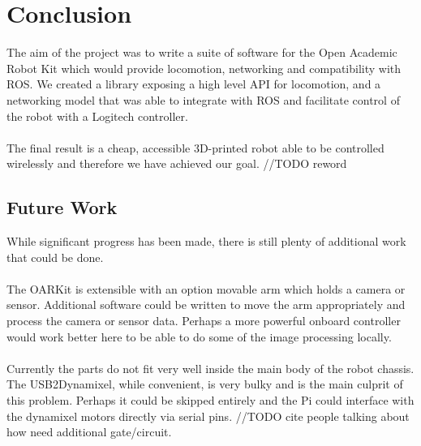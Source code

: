 \documentclass[]{article}
\begin{document}
\section{Conclusion}
The aim of the project was to write a suite of software for the Open Academic Robot Kit which would provide locomotion, networking and compatibility with ROS. We created a library exposing a high level API for locomotion, and a networking model that was able to integrate with ROS and facilitate control of the robot with a Logitech controller.
\\
\\
The final result is a cheap, accessible 3D-printed robot able to be controlled wirelessly and therefore we have achieved our goal. //TODO reword

\subsection{Future Work}
While significant progress has been made, there is still plenty of additional work that could be done.
\\
\\
The OARKit is extensible with an option movable arm which holds a camera or sensor. Additional software could be written to move the arm appropriately and process the camera or sensor data. Perhaps a more powerful onboard controller would work better here to be able to do some of the image processing locally.
\\
\\
Currently the parts do not fit very well inside the main body of the robot chassis. The USB2Dynamixel, while convenient, is very bulky and is the main culprit of this problem. Perhaps it could be skipped entirely and the Pi could interface with the dynamixel motors directly via serial pins. //TODO cite people talking about how need additional gate/circuit.
\end{document}
